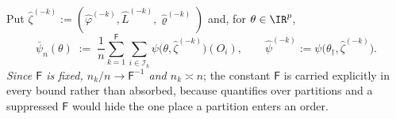 \begin{definition}
\begin{enumerate}
\end{enumerate}
Put $\hat\zeta^{(-k)}:=(\hat\varphi^{(-k)},\hat L^{(-k)},\hat\varrho^{(-k)})$ and, for $\theta\in\IR^{p}$,
\begin{equation}\label{eq:barpsi}
\bar\psi_n(\theta)\;:=\;\frac1n\sum_{k=1}^{\mathsf F}\sum_{i\in\mathcal I_k}\psi\big(\theta,\hat\zeta^{(-k)}\big)(O_i),
\qquad
\hat\psi^{(-k)}:=\psi\big(\theta_\dagger,\hat\zeta^{(-k)}\big).
\end{equation}
\emph{Since $\mathsf F$ is fixed, $n_k/n\to\mathsf F^{-1}$ and $n_k\asymp n$}; the constant $\mathsf F$ is
carried explicitly in every bound rather than absorbed, because  quantifies over
partitions and a suppressed $\mathsf F$ would hide the one place a partition enters an order.
\end{definition}

